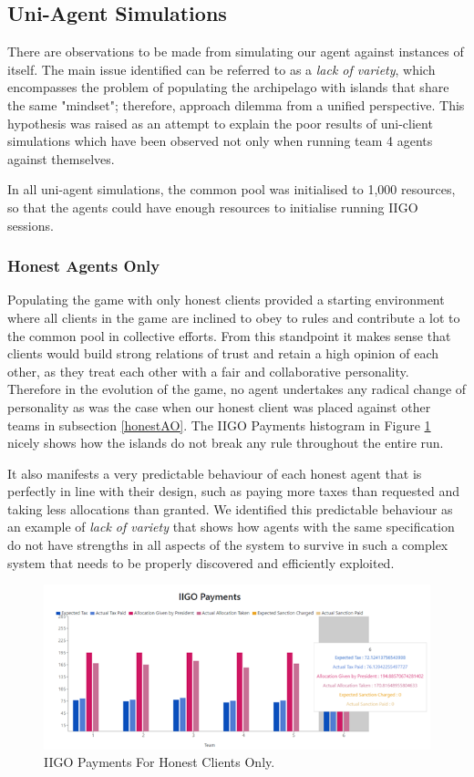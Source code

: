 \subsection{Uni-Agent Simulations} \label{againstself}
There are observations to be made from simulating our agent against instances of itself. The main issue identified can be referred to as a \emph{lack of variety}, which encompasses the problem of populating the archipelago with islands that share the same "mindset"; therefore, approach dilemma from a unified perspective. This hypothesis was raised as an attempt to explain the poor results of uni-client simulations which have been observed not only when running team 4 agents against themselves.

In all uni-agent simulations, the common pool was initialised to 1,000 resources, so that the agents could have enough resources to initialise running IIGO sessions.

\subsubsection{Honest Agents Only}
Populating the game with only honest clients provided a starting environment where all clients in the game are inclined to obey to rules and contribute a lot to the common pool in collective efforts. From this standpoint it makes sense that clients would build strong relations of trust and retain a high opinion of each other, as they treat each other with a fair and collaborative personality. Therefore in the evolution of the game, no agent undertakes any radical change of personality as was the case when our honest client was placed against other teams in subsection \ref{honestAO}. The IIGO Payments histogram in Figure \ref{fig:IIGOHH} nicely shows how the islands do not break any rule throughout the entire run.

It also manifests a very predictable behaviour of each honest agent that is perfectly in line with their design, such as paying more taxes than requested and taking less allocations than granted. We identified this predictable behaviour as an example of \emph{lack of variety} that shows how agents with the same specification do not have strengths in all aspects of the system to survive in such a complex system that needs to be properly discovered and efficiently exploited.

\begin{figure}[H]
\centering
\includegraphics[scale=0.8]{12_team4_agentdesign/images/IIGOHH.png}
\caption{IIGO Payments For Honest Clients Only.}
\label{fig:IIGOHH}
\end{figure}

